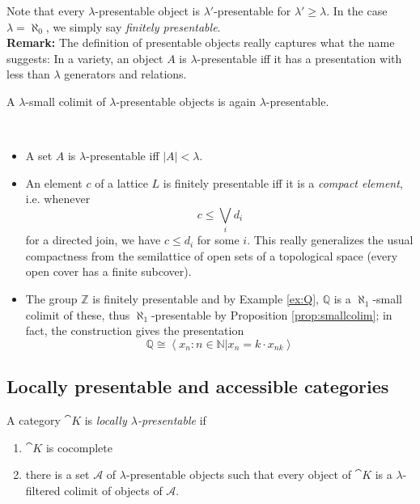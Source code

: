 Note that every $\lambda$-presentable object is $\lambda'$-presentable for $\lambda' \geq \lambda$. In the case $\lambda=\aleph_0$, we simply say \emph{finitely presentable}. \\

\textbf{Remark: } The definition of presentable objects really captures what the name suggests: In a variety, an object $A$ is $\lambda$-presentable iff it has a presentation with less than $\lambda$ generators and relations.
\begin{Proof}
\end{Proof}

\begin{Proposition}\label{prop:smallcolim} A $\lambda$-small colimit of $\lambda$-presentable objects is again $\lambda$-presentable.
\end{Proposition}

\begin{Example}\ \\
\begin{itemize}
\item A set $A$ is $\lambda$-presentable iff $|A| < \lambda$.
\item An element $c$ of a lattice $L$ is finitely presentable iff it is a \emph{compact element}, i.e. whenever
\[ c \leq \bigvee_i d_i \]
for a directed join, we have $c \leq d_i$ for some $i$. This really generalizes the usual compactness from the semilattice of open sets of a topological space (every open cover has a finite subcover).
\item The group $\mathbb Z$ is finitely presentable and by Example \ref{ex:Q}, $\mathbb Q$ is a $\aleph_1$-small colimit of these, thus $\aleph_1$-presentable by Proposition \ref{prop:smallcolim}; in fact, the construction gives the presentation
\[ \mathbb Q \cong \left\langle x_n : n \in \mathbb N | x_n = k \cdot x_{nk} \right \rangle\]
\end{itemize}
\end{Example}

\subsection{Locally presentable and accessible categories}


\begin{Definition}
A category $\cat K$ is \emph{locally $\lambda$-presentable} if
\begin{enumerate}
\item $\cat K$ is cocomplete
\item there is a set $\mathcal A$ of $\lambda$-presentable objects such that every object of $\cat K$ is a $\lambda$-filtered colimit of objects of $\mathcal A$.
\end{enumerate}
\end{Definition}

